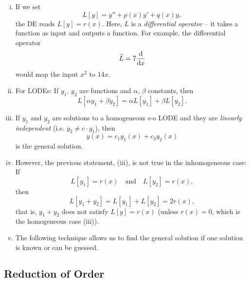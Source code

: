 \begin{remark}
\label{rem:s-o_lode}
\begin{enumerate}[(i)]
	\item If we set
	\[ L[y]=y''+p(x)y'+q(x)y, \]
	the DE reads $L[y]=r(x)$. Here, $L$ is a \emph{differential operator} -- it takes a function as input and outputs a function. For example, the differential operator
	\[ \widetilde{L}=7\displaystyle{\frac{\mathrm{d}}{\mathrm{d}x}} \]
	would map the input $x^2$ to $14x$.
	\item For LODEs: If $y_1,\,y_2$ are functions and $\alpha,\,\beta$ constants, then
	\[ L[\alpha y_1 + \beta y_2] = \alpha L[y_1] + \beta L[y_2]. \]
	\item If $y_1$ and $y_2$ are solutions to a homogeneous s-o LODE and they are \emph{linearly independent} (i.e. $y_2 \not= c \cdot y_1$), then
	\[ y(x) = c_1 y_1(x) + c_2 y_2(x) \]
	is the general solution.
	\item However, the previous statement, (iii), is not true in the inhomogeneous case: If
	\[ L[y_1] = r(x) \quad \text{and} \quad L[y_2] = r(x), \]
	then
	\[ L[y_1+y_2] = L[y_1] + L[y_2] = 2r(x), \]
	that is, $y_1+y_2$ does not satisfy $L[y]=r(x)$ (unless $r(x)=0$, which is the homogeneous case (iii)).
	\item The following technique allows us to find the general solution if one solution is known or can be guessed.
\end{enumerate}
\end{remark}

\subsection{Reduction of Order}

